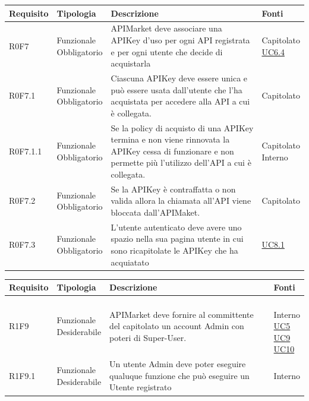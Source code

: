 \documentclass[12pt,a4paper,titlepage]{article}
\newcommand{\minitab}[2][1]{\begin{tabular}#1 #2\end{tabular}}
\newcommand{\uc}[1]{\hyperref[UC#1]{UC#1}}
\begin{document}
{\begin{longtable}{|m{5em}|m{6em}|m{28em}|m{5em}|}
			\hline
		\end{longtable}
		\begin{longtable}{|m{5em}|m{6em}|m{28em}|m{5em}|}
			\hline
			\textbf{Requisito} & \textbf{Tipologia}  & \textbf{Descrizione} & \textbf{Fonti} \\
			\hline
			R0F7 & \minitab[c]{Funzionale\\Obbligatorio} & APIMarket deve associare una APIKey d'uso per ogni API registrata e per ogni utente che decide di acquistarla & \shortstack[l]{Capitolato\\\uc{6.4}}\\
			\hline
			R0F7.1 & \minitab[c]{Funzionale\\Obbligatorio} & Ciascuna APIKey deve essere unica e può essere usata dall'utente che l'ha acquistata per accedere alla API a cui è collegata. & Capitolato\\
			\hline
			R0F7.1.1 & \minitab[c]{Funzionale\\Obbligatorio} & Se la policy di acquisto di una APIKey termina e non viene rinnovata la APIKey cessa di funzionare e non permette più l'utilizzo dell'API a cui è collegata. & \shortstack[l]{Capitolato \\ Interno}\\
			\hline
			R0F7.2 & \minitab[c]{Funzionale\\Obbligatorio} & Se la APIKey è contraffatta o non valida allora la chiamata all'API viene bloccata dall'APIMaket. & Capitolato\\
			\hline
			R0F7.3 & \minitab[c]{Funzionale\\Obbligatorio} & L'utente autenticato deve avere uno spazio nella sua pagina utente in cui sono ricapitolate le APIKey che ha acquiatato & \uc{8.1}\\
			\hline
		\end{longtable}
		\begin{longtable}{|m{5em}|m{6em}|m{28em}|m{5em}|}
			\hline
			\textbf{Requisito} & \textbf{Tipologia}  & \textbf{Descrizione} & \textbf{Fonti} \\
			\hline
			R1F9 & \minitab[c]{Funzionale\\Desiderabile} & APIMarket deve fornire al committente del capitolato un account Admin con poteri di Super-User. & \shortstack[l]{\\Interno\\\uc{5}\\\uc{9}\\\uc{10}}\\
			\hline
			R1F9.1 & \minitab[c]{Funzionale\\Desiderabile} & Un utente Admin deve poter eseguire qualuque funzione che può eseguire un Utente registrato & Interno\\

\end{longtable}}
\end{document}
